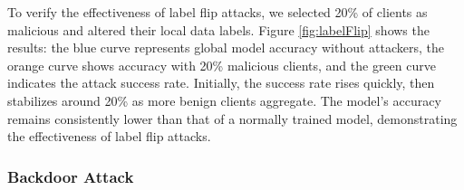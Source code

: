 \documentclass[conference]{IEEEtran}
\begin{document}


To verify the effectiveness of label flip attacks, we selected 20\% of clients as malicious and altered their local data labels. Figure \hyperref[fig:labelFlip]{\ref{fig:labelFlip}} shows the results: the blue curve represents global model accuracy without attackers, the orange curve shows accuracy with 20\% malicious clients, and the green curve indicates the attack success rate. Initially, the success rate rises quickly, then stabilizes around 20\% as more benign clients aggregate. The model's accuracy remains consistently lower than that of a normally trained model, demonstrating the effectiveness of label flip attacks.

\subsubsection{\textbf{Backdoor Attack}}
\label{exp:attack:backdoor}

\end{document}
